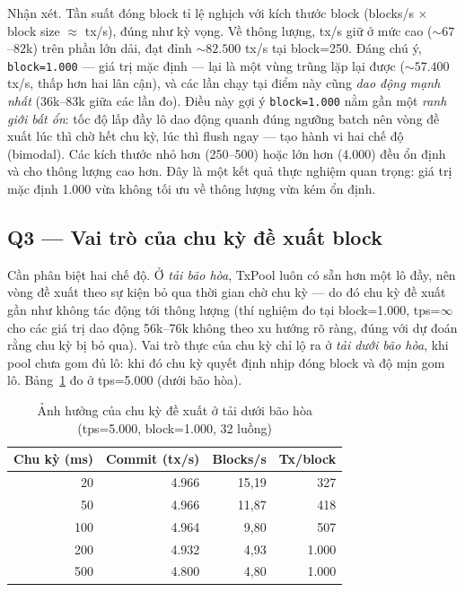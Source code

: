 Nhận xét. Tần suất đóng block tỉ lệ nghịch với kích thước block (blocks/s
$\times$ block size $\approx$ tx/s), đúng như kỳ vọng. Về thông lượng, tx/s giữ ở
mức cao (${\sim}67$--$82$k) trên phần lớn dải, đạt đỉnh ${\sim}82.500$ tx/s
tại block=250. Đáng chú ý, \texttt{block=1.000} --- giá trị mặc định --- lại là
một vùng trũng lặp lại được (${\sim}57.400$ tx/s, thấp hơn hai lân cận),
và các lần chạy tại điểm này cũng \textit{dao động mạnh nhất} (36k--83k giữa các
lần đo). Điều này gợi ý \texttt{block=1.000} nằm gần một \textit{ranh giới bất ổn}:
tốc độ lấp đầy lô dao động quanh đúng ngưỡng batch nên vòng đề xuất lúc thì chờ
hết chu kỳ, lúc thì flush ngay --- tạo hành vi hai chế độ (bimodal). Các kích thước
nhỏ hơn (250--500) hoặc lớn hơn (4.000) đều ổn định và cho thông lượng cao hơn.
Đây là một kết quả thực nghiệm quan trọng: giá trị mặc định 1.000 vừa
không tối ưu về thông lượng vừa kém ổn định.

\subsection{Q3 --- Vai trò của chu kỳ đề xuất block}
\label{sec:eval-interval}

Cần phân biệt hai chế độ. Ở \textit{tải bão hòa}, TxPool luôn có sẵn hơn một lô
đầy, nên vòng đề xuất theo sự kiện bỏ qua thời gian chờ chu kỳ --- do đó chu kỳ đề
xuất gần như không tác động tới thông lượng (thí nghiệm đo tại
block=1.000, tps=$\infty$ cho các giá trị dao động 56k--76k không theo xu hướng rõ
ràng, đúng với dự đoán rằng chu kỳ bị bỏ qua). Vai trò thực của chu kỳ chỉ lộ ra ở
\textit{tải dưới bão hòa}, khi pool chưa gom đủ lô: khi đó chu kỳ quyết định nhịp
đóng block và độ mịn gom lô. Bảng~\ref{tab:eval-interval} đo ở tps=5.000 (dưới
bão hòa).

\begin{table}[H]
\centering
\caption{Ảnh hưởng của chu kỳ đề xuất ở tải dưới bão hòa (tps=5.000, block=1.000, 32 luồng)}
\label{tab:eval-interval}
\begin{tabular}{@{}rrrr@{}}
\toprule
\textbf{Chu kỳ (ms)} & \textbf{Commit (tx/s)} & \textbf{Blocks/s} & \textbf{Tx/block} \\
\midrule
20  & 4.966 & 15,19 & 327 \\
50  & 4.966 & 11,87 & 418 \\
100 & 4.964 & 9,80  & 507 \\
200 & 4.932 & 4,93  & 1.000 \\
500 & 4.800 & 4,80  & 1.000 \\
\bottomrule
\end{tabular}
\end{table}

